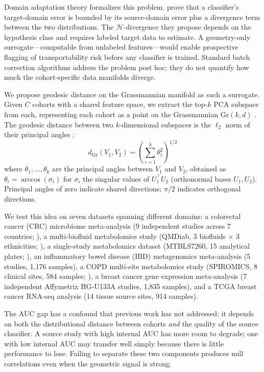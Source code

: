 \documentclass{article}
\begin{document}
Domain adaptation theory formalizes this problem. \citet{bendavid2010theory} prove that a classifier's target-domain error is bounded by its source-domain error plus a divergence term between the two distributions. The $\mathcal{H}$-divergence they propose depends on the hypothesis class and requires labeled target data to estimate. A geometry-only surrogate---computable from unlabeled features---would enable prospective flagging of transportability risk before any classifier is trained. Standard batch correction algorithms \citep{johnson2007adjusting} address the problem post hoc; they do not quantify how much the cohort-specific data manifolds diverge.

We propose geodesic distance on the Grassmannian manifold as such a surrogate. Given $C$ cohorts with a shared feature space, we extract the top-$k$ PCA subspace from each, representing each cohort as a point on the Grassmannian $\mathrm{Gr}(k, d)$ \citep{edelman1998geometry}. The geodesic distance between two $k$-dimensional subspaces is the $\ell_2$ norm of their principal angles \citep{bjorck1973numerical, ye2016schubert}:
\begin{equation}
d_{\mathrm{Gr}}(V_1, V_2) = \left(\sum_{i=1}^{k} \theta_i^2\right)^{1/2}
\end{equation}
where $\theta_1, \ldots, \theta_k$ are the principal angles between $V_1$ and $V_2$, obtained as $\theta_i = \arccos(\sigma_i)$ for $\sigma_i$ the singular values of $U_1^\top U_2$ (orthonormal bases $U_1, U_2$). Principal angles of zero indicate shared directions; $\pi/2$ indicates orthogonal directions.

We test this idea on seven datasets spanning different domains: a colorectal cancer (CRC) microbiome meta-analysis (9 independent studies across 7 countries; \citealp{wirbel2019meta}), a multi-biofluid metabolomics study (QMDiab, 3 biofluids $\times$ 3 ethnicities; \citealp{yousri2015metabolic}), a single-study metabolomics dataset (MTBLS7260, 15 analytical plates; \citealp{leonletelier2024contributions}), an inflammatory bowel disease (IBD) metagenomics meta-analysis (5 studies, 1{,}176 samples), a COPD multi-site metabolomics study (SPIROMICS, 8 clinical sites, 584 samples; \citealp{bowler2017spiromics}), a breast cancer gene expression meta-analysis (7 independent Affymetrix HG-U133A studies, 1{,}835 samples), and a TCGA breast cancer RNA-seq analysis (14 tissue source sites, 914 samples).

The AUC gap has a confound that previous work has not addressed: it depends on both the distributional distance between cohorts \emph{and} the quality of the source classifier. A source study with high internal AUC has more room to degrade; one with low internal AUC may transfer well simply because there is little performance to lose. Failing to separate these two components produces null correlations even when the geometric signal is strong.
\end{document}

